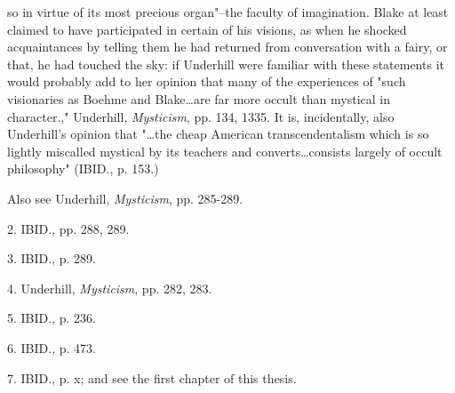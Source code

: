 so in virtue of its most precious organ"--the faculty of imagination. Blake at least claimed to have
participated in certain of his visions, as when he shocked acquaintances by telling them he had returned from
conversation with a fairy, or that, he had touched the sky: if Underhill were familiar with these
statements it would probably add to her opinion that many of the experiences of "such visionaries as Boehme and
Blake\dots are far more occult than mystical in character.," Underhill, \textit{Mysticism}, pp. 134, 1335. It is, incidentally, also Underhill's
opinion that "\dots the cheap American transcendentalism which is so lightly miscalled mystical by its
teachers and converts\dots consists largely of occult philosophy" (IBID., p. 153.)\par
\noindent Also see Underhill, \textit{Mysticism}, pp. 285-289.\par
2. IBID., pp. 288, 289.\par
3. IBID., p. 289.\par
4. Underhill, \textit{Mysticism}, pp. 282, 283.\par
5. IBID., p. 236.\par
6. IBID., p. 473.\par
7. IBID., p. x; and see the first chapter of this thesis.\par

\newpage

